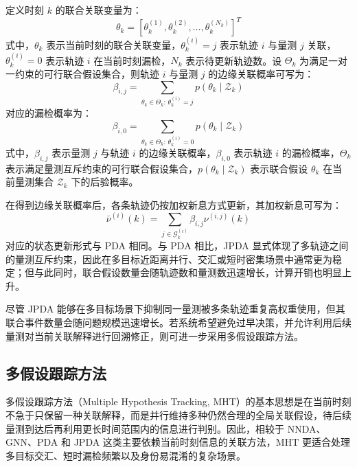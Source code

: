\documentclass{xdupgthesis}
\begin{document}
定义时刻 $k$ 的联合关联变量为：
\begin{equation}
	\theta_k
	=
	\left[
	\theta_k^{(1)},\theta_k^{(2)},\ldots,\theta_k^{(N_k)}
	\right]^{T}
\end{equation}
式中，$\theta_k$ 表示当前时刻的联合关联变量，$\theta_k^{(i)}=j$ 表示轨迹 $i$ 与量测 $j$ 关联，$\theta_k^{(i)}=0$ 表示轨迹 $i$ 在当前时刻漏检，$N_k$ 表示待更新轨迹数。设 $\Theta_k$ 为满足一对一约束的可行联合假设集合，则轨迹 $i$ 与量测 $j$ 的边缘关联概率可写为：
\begin{equation}
	\beta_{i,j}
	=
	\sum_{\theta_k\in\Theta_k:\,\theta_k^{(i)}=j}
	p\!\left(
	\theta_k\mid\mathcal{Z}_k
	\right)
\end{equation}
对应的漏检概率为：
\begin{equation}
	\beta_{i,0}
	=
	\sum_{\theta_k\in\Theta_k:\,\theta_k^{(i)}=0}
	p\!\left(
	\theta_k\mid\mathcal{Z}_k
	\right)
\end{equation}
式中，$\beta_{i,j}$ 表示量测 $j$ 与轨迹 $i$ 的边缘关联概率，$\beta_{i,0}$ 表示轨迹 $i$ 的漏检概率，$\Theta_k$ 表示满足量测互斥约束的可行联合假设集合，$p(\theta_k\mid\mathcal{Z}_k)$ 表示联合假设 $\theta_k$ 在当前量测集合 $\mathcal{Z}_k$ 下的后验概率。

在得到边缘关联概率后，各条轨迹仍按加权新息方式更新，其加权新息可写为：
\begin{equation}
	\bar{\nu}^{(i)}(k)
	=
	\sum_{j\in\mathcal{G}^{(i)}_k}
	\beta_{i,j}\nu^{(i,j)}(k)
\end{equation}
对应的状态更新形式与 PDA 相同。与 PDA 相比，JPDA 显式体现了多轨迹之间的量测互斥约束，因此在多目标近距离并行、交汇或短时密集场景中通常更为稳定；但与此同时，联合假设数量会随轨迹数和量测数迅速增长，计算开销也明显上升。

尽管 JPDA 能够在多目标场景下抑制同一量测被多条轨迹重复高权重使用，但其联合事件数量会随问题规模迅速增长。若系统希望避免过早决策，并允许利用后续量测对当前关联解释进行回溯修正，则可进一步采用多假设跟踪方法。


\subsection{多假设跟踪方法}

多假设跟踪方法（Multiple Hypothesis Tracking, MHT）的基本思想是在当前时刻不急于只保留一种关联解释，而是并行维持多种仍然合理的全局关联假设，待后续量测到达后再利用更长时间范围内的信息进行判别\cite{gui2022doubleloopmht}。因此，相较于 NNDA、GNN、PDA 和 JPDA 这类主要依赖当前时刻信息的关联方法，MHT 更适合处理多目标交汇、短时漏检频繁以及身份易混淆的复杂场景。
\end{document}
